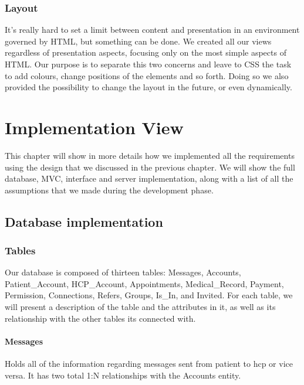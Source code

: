 \subsection{Layout}
It's really hard to set a limit between content and presentation in an environment governed by HTML, but something can be done. We created all our views regardless of presentation aspects, focusing only on the most simple aspects of HTML. Our purpose is to separate this two concerns and leave to CSS the task to add colours, change positions of the elements and so forth. Doing so we also provided the possibility to change the layout in the future, or even dynamically.



\chapter{Implementation View}
This chapter will show in more details how we implemented all the requirements using the design that we discussed in the previous chapter. We will show the full database, MVC, interface and server implementation, along with a list of all the assumptions that we made during the development phase.

\section{Database implementation}
\subsection{Tables}
Our database is composed of thirteen tables: Messages, Accounts, Patient\_Account, HCP\_Account, Appointments, Medical\_Record, Payment, Permission, Connections, Refers, Groups, Is\_In, and Invited.  For each table, we will present a description of the table and the attributes in it, as well as its relationship with the other tables its connected with.

\subsubsection{Messages}
Holds all of the information regarding messages sent from patient to hcp or vice versa. It has two total 1:N relationships with the Accounts entity.

